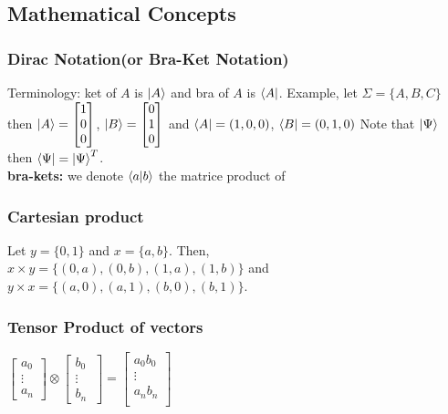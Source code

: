\documentclass[5pt]{article}
\begin{document}
\begin{multicols}{3}
\newpage

\subsection{Mathematical Concepts}

\subsubsection{Dirac Notation\footnotesize{(or Bra-Ket Notation)}}
Terminology: ket of $A$ is $\ket{A}$ and bra of $A$ is $\bra{A}$.
Example, let $\Sigma=\{A,B,C\}$ then $\ket{A}=\begin{bmatrix}1\\0\\0 \end{bmatrix}$, $\ket{B}=\begin{bmatrix}0\\1\\0 \end{bmatrix}$
and $\bra{A}=(1,0,0)$, $\bra{B}=(0,1,0)$
Note that $\ket{\Psi}$ then $\bra{\Psi}=\ket{\Psi}^T$.\\
\textbf{bra-kets:} we denote $\braket{a}{b}$ the matrice product of 


\subsubsection{Cartesian product}
Let $y=\{0,1\}$ and  $x=\{a,b\}$. Then, \\
$x\times y = \{(0,a),(0,b),(1,a),(1,b)\}$ and \\
$y\times x = \{(a,0),(a,1),(b,0),(b,1)\}$.

\subsubsection{Tensor Product of vectors}
$\begin{bmatrix}a_0\\ \vdots\\a_n \end{bmatrix}\otimes\begin{bmatrix}b_0\\ \vdots\\b_n\ \end{bmatrix}= \begin{bmatrix}a_0b_0\\ \vdots\\a_nb_n\\ \end{bmatrix}$



\end{multicols}
\end{document}
